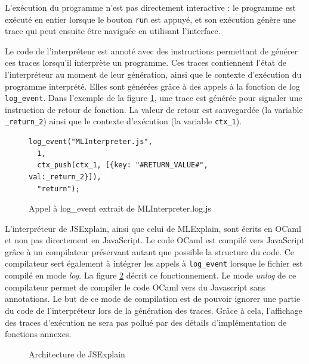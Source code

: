 \documentclass{easychair}
\begin{document}
L'exécution du programme n'est pas directement interactive : le programme est
exécuté en entier lorsque le bouton \texttt{run} est appuyé, et son exécution
génère une trace qui peut ensuite être naviguée en utilisant l'interface.

Le code de l'interpréteur est annoté avec des instructions permettant de générer
ces traces lorsqu'il interprète un programme. Ces traces contiennent l'état de
l'interpréteur au moment de leur génération, ainsi que le contexte d'exécution
du programme interprété. Elles sont générées grâce à des appels à la fonction de
log \verb|log_event|. Dans l'exemple de la figure \ref{log_event}, une trace est
générée pour signaler une instruction de retour de fonction. La valeur de retour
est sauvegardée (la variable \verb|_return_2|) ainsi que le contexte d'exécution
(la variable \verb|ctx_1|).

\begin{figure}[ht]
\begin{verbatim}
log_event("MLInterpreter.js",
  1,
  ctx_push(ctx_1, [{key: "#RETURN_VALUE#", val:_return_2}]),
  "return");
\end{verbatim}
\caption{Appel à log\_event extrait de MLInterpreter.log.js}
\label{log_event}
\end{figure}

L'interpréteur de JSExplain, ainsi que celui de MLExplain, sont écrits en OCaml
et non pas directement en JavaScript. Le code OCaml est compilé vers JavaScript
grâce à un compilateur préservant autant que possible la structure du code. Ce
compilateur sert également à intégrer les appels à \verb|log_event| lorsque le
fichier est compilé en mode \emph{log}. La figure \ref{arch_jsexplain} décrit ce
fonctionnement. Le mode \emph{unlog} de ce compilateur permet de compiler le
code OCaml vers du Javascript sans annotations. Le but de ce mode de compilation
est de pouvoir ignorer une partie du code de l'interpréteur lors de la
génération des traces. Grâce à cela, l'affichage des traces d'exécution ne sera
pas pollué par des détails d'implémentation de fonctions annexes.

\begin{figure}[ht]
  
  \caption{Architecture de JSExplain}
  \label{arch_jsexplain}
\end{figure}
\end{document}
